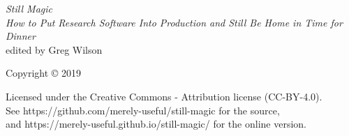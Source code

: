 \documentclass[10pt,letterpaper]{memoir}
\begin{document}
\pagestyle{empty}

{\begingroup
  \raggedleft
  \vspace*{\baselineskip}

  {\Huge\itshape Still Magic}\\[\baselineskip]

  {\large\itshape
    How to Put Research Software Into Production and Still Be Home in Time for Dinner
  }\\[0.2\textheight]

  {\large edited by Greg Wilson}\par

  \vfill

  {\large Copyright {\copyright} 2019}

  \vspace*{\baselineskip}


  \vspace*{\baselineskip}

  {\small
    Licensed under the Creative Commons - Attribution license (CC-BY-4.0).
    \\
    See https://github.com/merely-useful/still-magic for the source,\\
    and https://merely-useful.github.io/still-magic/ for the online version.
  }

\endgroup}

\newpage

\pagestyle{empty}

~

\newpage

\tableofcontents

\newpage
\listoffigures

\newpage
\pagestyle{empty}

~

\newpage

\pagestyle{plain}


\end{document}
